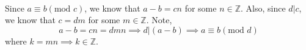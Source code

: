 \documentclass[letterpaper,12pt]{article}
\theoremstyle{definition}
\begin{document}
\\
Since $a \equiv b(\text{mod }c)$, we know that $a-b = cn$ for some $n \in \mathbb{Z}$.
Also, since $d|c$, we know that $c = dm$ for some $m \in \mathbb{Z}$. Note,\\
\[a-b = cn = dmn \implies d|(a-b) \implies a \equiv b(\text{mod }d)\]
where $k = mn \implies k \in \mathbb{Z}$.

\\
\end{document}
